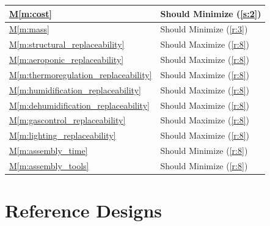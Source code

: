 \documentclass{../tex/report}
\newcommand{\mref}[1]{\hyperref[#1]{M\ref{#1}}}
\begin{document}
\begin{tabular}{|l|p{14.35cm}|}
    \mref{m:cost}                       & Should Minimize            \hfill (\ref{s:2})                          \\ \hline
    \mref{m:mass}                       & Should Minimize           \hfill (\ref{r:3})                          \\ \hline
    \mref{m:structural_replaceability}  & Should Maximize           \hfill (\ref{r:8})                          \\ \hline
    \mref{m:aeroponic_replaceability}       & Should Maximize           \hfill (\ref{r:8})                          \\ \hline
    \mref{m:thermoregulation_replaceability} & Should Maximize           \hfill (\ref{r:8})                          \\ \hline
    \mref{m:humidification_replaceability}   & Should Maximize           \hfill (\ref{r:8})                          \\ \hline
    \mref{m:dehumidification_replaceability} & Should Maximize           \hfill (\ref{r:8})                          \\ \hline
    \mref{m:gascontrol_replaceability} & Should Maximize           \hfill (\ref{r:8})                          \\ \hline
    \mref{m:lighting_replaceability}    & Should Maximize           \hfill (\ref{r:8})                          \\ \hline
    \mref{m:assembly_time}                 & Should Minimize           \hfill (\ref{r:8})                          \\ \hline
    \mref{m:assembly_tools}                & Should Minimize           \hfill (\ref{r:8})                          \\ \hline
\end{tabular}


\clearpage

\section{Reference Designs}

\end{document}

